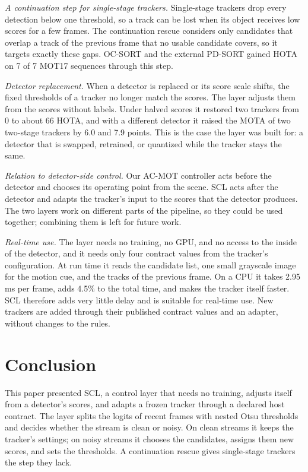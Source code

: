\documentclass[pdflatex,sn-mathphys-num,iicol]{sn-jnl}
\newcommand{\scl}{SCL}
\begin{document}
\emph{A continuation step for single-stage trackers.} Single-stage trackers
drop every detection below one threshold, so a track can be lost when its
object receives low scores for a few frames. The continuation rescue
considers only candidates that overlap a track of the previous frame that no
usable candidate covers, so it targets exactly these gaps. OC-SORT and the
external PD-SORT gained HOTA on 7 of 7 MOT17 sequences through this step.

\emph{Detector replacement.} When a detector is replaced or its score scale
shifts, the fixed thresholds of a tracker no longer match the scores. The
layer adjusts them from the scores without labels. Under halved scores it
restored two trackers from 0 to about 66 HOTA, and with a different detector
it raised the MOTA of two two-stage trackers by 6.0 and 7.9 points. This is
the case the layer was built for: a detector that is swapped, retrained, or
quantized while the tracker stays the same.

\emph{Relation to detector-side control.} Our AC-MOT controller acts
before the detector and chooses its operating point from the scene. \scl{}
acts after the detector and adapts the tracker's input to the scores that the
detector produces. The two layers work on different parts of the pipeline,
so they could be used together; combining them is left for future work.

\emph{Real-time use.} The layer needs no training, no GPU, and no access to
the inside of the detector, and it needs only four contract values from the
tracker's configuration. At run time it reads the candidate list, one small
grayscale image for the motion cue, and the tracks of the previous frame. On
a CPU it takes 2.95 ms per frame, adds 4.5\% to the total time, and makes the
tracker itself faster. \scl{} therefore adds very little delay and is
suitable for real-time use. New trackers are added through their published
contract values and an adapter, without changes to the rules.
\section{Conclusion}\label{sec:conclusion}

This paper presented \scl{}, a control layer that needs no training, adjusts
itself from a detector's scores, and adapts a frozen tracker through a
declared host contract. The layer splits the logits of recent frames with
nested Otsu thresholds and decides whether the stream is clean or noisy. On
clean streams it keeps the tracker's settings; on noisy streams it chooses
the candidates, assigns them new scores, and sets the thresholds. A
continuation rescue gives single-stage trackers the step they lack.
\end{document}
